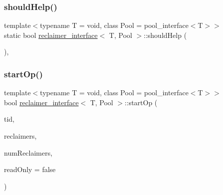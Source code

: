 \mbox{\label{classreclaimer__interface_af20ec23a47f79d303a18551fd8706f2d}} 
\subsubsection{\texorpdfstring{should\+Help()}{shouldHelp()}}
{\footnotesize\ttfamily template$<$typename T  = void, class Pool  = pool\+\_\+interface$<$\+T$>$$>$ \\
static bool \hyperlink{classreclaimer__interface}{reclaimer\+\_\+interface}$<$ T, Pool $>$\+::should\+Help (\begin{DoxyParamCaption}{ }\end{DoxyParamCaption})\hspace{0.3cm}{\ttfamily [inline]}, {\ttfamily [static]}}

\mbox{\label{classreclaimer__interface_a99471b7a8f06a80d81896e269ea63cc9}} 
\subsubsection{\texorpdfstring{start\+Op()}{startOp()}}
{\footnotesize\ttfamily template$<$typename T  = void, class Pool  = pool\+\_\+interface$<$\+T$>$$>$ \\
bool \hyperlink{classreclaimer__interface}{reclaimer\+\_\+interface}$<$ T, Pool $>$\+::start\+Op (\begin{DoxyParamCaption}\item[{const int}]{tid,  }\item[{void $\ast$const $\ast$const}]{reclaimers,  }\item[{const int}]{num\+Reclaimers,  }\item[{const bool}]{read\+Only = {\ttfamily false} }\end{DoxyParamCaption})\hspace{0.3cm}{\ttfamily [inline]}}

\mbox{\label{classreclaimer__interface_a965d5fd618ce50fb9a5db0d6e4a8dc9e}} 
